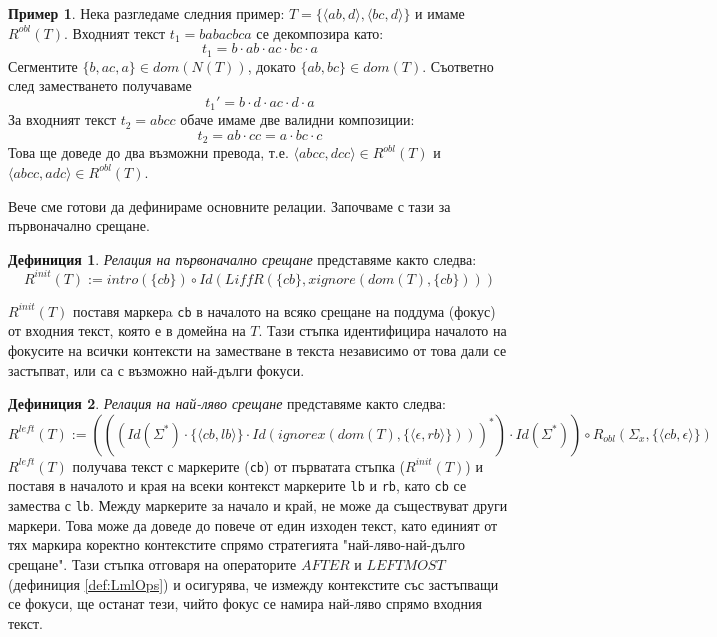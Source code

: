\documentclass[12pt, oneside]{article}
\theoremstyle{definition}
\newtheorem{definition}{Дефиниция}[section]
\newtheorem{example}{Пример}[section]
\begin{document}
\begin{example}
	Нека разгледаме следния пример: \(T = \{ \langle ab, d \rangle, \langle bc, d \rangle \} \) и имаме \(R^{obl}(T) \). Входният текст \( t_1 = babacbca \) се декомпозира като:
	\[ t_1 = b \cdot ab \cdot ac \cdot bc \cdot a \]
	Сегментите \(\{b, ac, a\} \in dom(N(T))\), докато \(\{ab, bc\} \in dom(T)\). Съответно след заместването получаваме
	\[ t_1' = b \cdot d \cdot ac \cdot d \cdot a \]
	За входният текст \( t_2 = abcc \) обаче имаме две валидни композиции:
	\[ t_2 = ab \cdot cc = a \cdot bc \cdot c \]
	Това ще доведе до два възможни превода, т.е. \( \langle abcc, dcc \rangle \in R^{obl}(T) \) и \( \langle abcc, adc \rangle \in R^{obl}(T) \).
\end{example}

Вече сме готови да дефинираме основните релации. Започваме с тази за първоначално срещане.

\begin{definition}\label{def:Rinit} \emph{Релация на първоначално срещане} представяме както следва:
	\[ R^{init}(T) := intro(\{ cb \}) \circ Id(LiffR(\{ cb \}, xignore(dom(T), \{ cb \}))) \]

	\( R^{init}(T) \) поставя маркерa \verb/cb/ в началото на всяко срещане на поддума (фокус) от входния текст, която е в домейна на \(T\). Тази стъпка идентифицира началото на фокусите на всички контексти на заместване в текста независимо от това дали се застъпват, или са с възможно най-дълги фокуси. 
\end{definition}

\begin{definition}\label{def:Rleft} \emph{Релация на най-ляво срещане} представяме както следва:
	\[ R^{left}(T) := (((Id(\Sigma^*) \cdot \{ \langle cb, lb \rangle \} \cdot Id(ignorex(dom(T), \{ \langle \epsilon, rb \rangle \})))^*) \cdot Id(\Sigma^*)) \circ R_{obl} (\Sigma_x, \{ \langle cb, \epsilon \rangle \}) \]
	\(R^{left}(T)\) получава текст с маркерите (\verb/cb/) от първатата стъпка (\(R^{init}(T)\)) и поставя в началото и края на всеки контекст маркерите \verb/lb/ и \verb/rb/, като  \verb/cb/ се замества с \verb/lb/. Между маркерите за начало и край, не може да съществуват други маркери. Това може да доведе до повече от един изходен текст, като единият от тях маркира коректно контекстите спрямо стратегията "най-ляво-най-дълго срещане". Тази стъпка отговаря на операторите \(AFTER \text{ и } LEFTMOST\) (дефиниция \ref{def:LmlOps}) и осигурява, че измежду контекстите със застъпващи се фокуси, ще останат тези, чийто фокус се намира най-ляво спрямо входния текст.
\end{definition}
\end{document}

